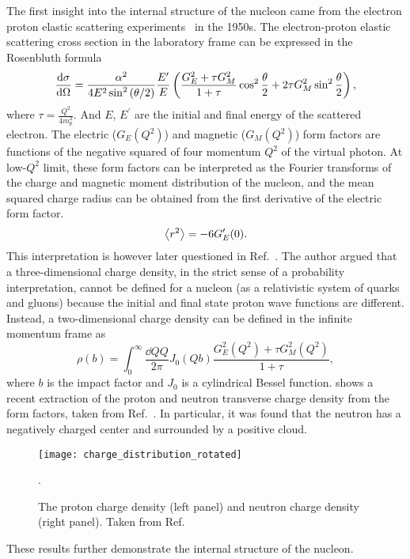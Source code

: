 \documentclass[../main.tex]{subfiles}
\begin{document}
The first insight into the internal structure of the nucleon came from the
electron proton elastic scattering experiments~\cite{hofstadter1956} in the
1950s. The electron-proton elastic scattering cross section in the laboratory
frame can be expressed in the Rosenbluth formula~\cite{rosenbluth1950}
\begin{equation}
	\dv{\sigma}{\Omega} = \frac{\alpha^2}{4E^2 \sin^2\left(\theta/2\right)}
	\frac{E^\prime}{E} \left( \frac{G_E^2+\tau G_M^2}{1+\tau} \cos^2
	\frac{\theta}{2} + 2\tau G_M^2 \sin^2 \frac{\theta}{2}\right)
	\label{eq:ep_cs},
\end{equation}
where $\tau = \frac{Q^2}{4m_p^2}$.
And $E$, $E^\prime$ are the initial and final energy of the scattered electron.
The electric ($G_E\left(Q^2\right)$) and magnetic ($G_M\left(Q^2\right)$) form
factors are functions of the negative squared of four momentum $Q^2$ of the virtual photon. At
low-$Q^2$ limit, these form factors can be interpreted as the Fourier transforms
of the charge and magnetic moment distribution of the nucleon, and the mean squared
charge radius can be obtained from the first derivative of the electric form factor.
\begin{equation}
	\expval{r^2}=-6G^\prime_E(0).
\end{equation}
This interpretation is however later questioned in Ref.~\cite{miller2007,miller2019}.
The author argued that a three-dimensional charge density, in the strict sense of a
probability interpretation, cannot be defined for a nucleon (as a relativistic system of quarks and gluons)
because the initial and final state proton wave functions are different. Instead,
a two-dimensional charge density can be defined in the infinite momentum frame as 
\begin{equation}
	\rho(b)=\int^\infty_0 \frac{\dd{Q}Q}{2\pi} J_0(Qb)\frac{G_E^2(Q^2)+\tau G_M^2(Q^2)}{1+\tau},
\end{equation}
where $b$ is the impact factor and $J_0$ is a cylindrical Bessel function.
shows a recent extraction of the proton and neutron transverse charge density from the
form factors, taken from Ref.~\cite{miller2007}. In particular, it was found that
the neutron has a negatively charged center and surrounded by a positive cloud.
\begin{figure}[hbp!]
	\centering
	\texttt{[image: charge\_distribution\_rotated]}
	\caption{The proton charge density (left panel) and neutron charge density
		(right panel). Taken from Ref.~\cite{miller2007}}.
	\label{fig:charge}
\end{figure}
These results further demonstrate the internal structure of the nucleon.
\end{document}
